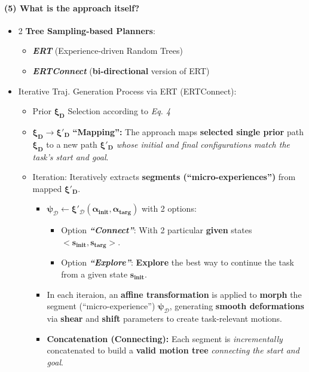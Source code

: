 \documentclass{article}
\begin{document}
\paragraph{(5) What is the approach itself?}
\begin{itemize}
  \item 2 \textbf{Tree Sampling-based Planners}:
  \begin{itemize}
    \item \textbf{\textit{ERT}} (Experience-driven Random Trees)
    \item \textbf{\textit{ERTConnect}} (\textbf{bi-directional} version of ERT)
  \end{itemize}
  \item Iterative Traj. Generation Process via ERT (ERTConnect):
  \begin{itemize}
    \item Prior $\bm{\xi_D}$ Selection according to \textit{Eq. 4}
    \item ${\bm{\xi_D \to \xi'_D}}$ \textbf{``Mapping'':} The approach maps \textbf{selected single prior} path ${\bm{\xi_D}}$ to a new path ${\bm{\xi'_D}}$ \textit{whose initial and final configurations match the task's start and goal}.
    \item Iteration: Iteratively extracts \textbf{segments (``micro-experiences'')} from mapped $\bm{\xi'_D}$.
    \begin{itemize}
      \item $\bm{\psi_{\mathcal{D}} \leftarrow \xi'_{\mathcal{D}}(\alpha_{\text{init}}, \alpha_{\text{targ}})}$ with 2 options:
      \begin{itemize}
        \item Option \textbf{\textit{``Connect''}}: With 2 particular \textbf{given} states ${<\bm{s_{init}}, \bm{s_{targ}}>}$.
        \item Option \textbf{\textit{``Explore''}}: \textbf{Explore} the best way to continue the task from a given state $\bm{s_{init}}$.
      \end{itemize}
      \item In each iteraion, an \textbf{affine transformation} is applied to \textbf{morph} the segment (``micro-experience'') $\bm{\psi_{\mathcal{D}}}$, generating \textbf{smooth deformations} via \textbf{shear} and \textbf{shift} parameters to create task-relevant motions.
      \item \textbf{Concatenation (Connecting):} Each segment is \textit{incrementally} concatenated to build a \textbf{valid motion tree} \textit{connecting the start and goal}.

\end{itemize}
\end{itemize}
\end{itemize}
\end{document}
